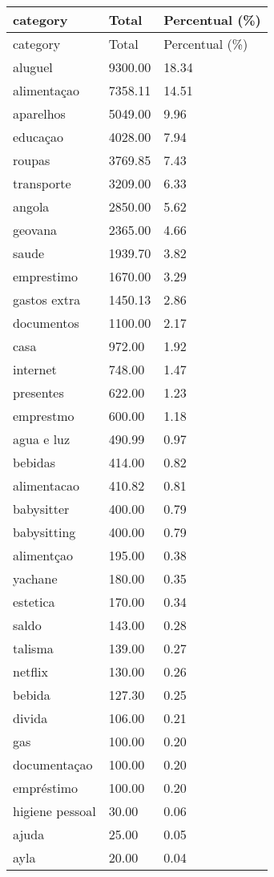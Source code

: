 \documentclass[
  8pt,
  a4paper,
  DIV=11,
  numbers=noendperiod]{scrartcl}
\begin{document}
\begin{figure}
\begin{minipage}{0.50\linewidth}
\begin{longtable}[]{@{}lll@{}}
\caption{}\label{T_d1df4}\tabularnewline
\toprule\noalign{}
category & Total & Percentual (\%) \\
\midrule\noalign{}
\endfirsthead
\toprule\noalign{}
category & Total & Percentual (\%) \\
\midrule\noalign{}
\endhead
\bottomrule\noalign{}
\endlastfoot
aluguel & 9300.00 & 18.34 \\
alimentaçao & 7358.11 & 14.51 \\
aparelhos & 5049.00 & 9.96 \\
educaçao & 4028.00 & 7.94 \\
roupas & 3769.85 & 7.43 \\
transporte & 3209.00 & 6.33 \\
angola & 2850.00 & 5.62 \\
geovana & 2365.00 & 4.66 \\
saude & 1939.70 & 3.82 \\
emprestimo & 1670.00 & 3.29 \\
gastos extra & 1450.13 & 2.86 \\
documentos & 1100.00 & 2.17 \\
casa & 972.00 & 1.92 \\
internet & 748.00 & 1.47 \\
presentes & 622.00 & 1.23 \\
emprestmo & 600.00 & 1.18 \\
agua e luz & 490.99 & 0.97 \\
bebidas & 414.00 & 0.82 \\
alimentacao & 410.82 & 0.81 \\
babysitter & 400.00 & 0.79 \\
babysitting & 400.00 & 0.79 \\
alimentçao & 195.00 & 0.38 \\
yachane & 180.00 & 0.35 \\
estetica & 170.00 & 0.34 \\
saldo & 143.00 & 0.28 \\
talisma & 139.00 & 0.27 \\
netflix & 130.00 & 0.26 \\
bebida & 127.30 & 0.25 \\
divida & 106.00 & 0.21 \\
gas & 100.00 & 0.20 \\
documentaçao & 100.00 & 0.20 \\
empréstimo & 100.00 & 0.20 \\
higiene pessoal & 30.00 & 0.06 \\
ajuda & 25.00 & 0.05 \\
ayla & 20.00 & 0.04 \\
\end{longtable}


\end{minipage}
\end{figure}
\end{document}
